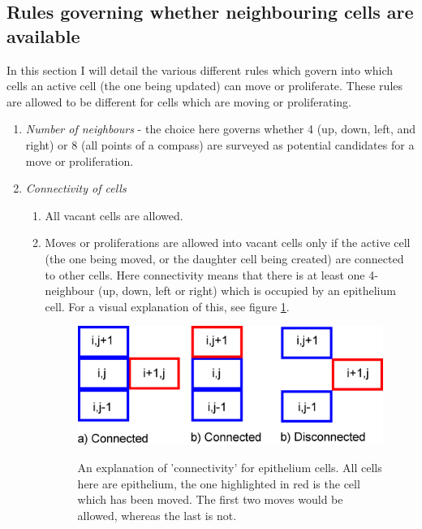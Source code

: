 \documentclass[pdftex,10pt,a4paper]{article}
\begin{document}
\subsection{Rules governing whether neighbouring cells are available}\label{sec:rule_available}
In this section I will detail the various different rules which govern into which cells an active cell (the one being updated) can move or proliferate. These rules are allowed to be different for cells which are moving or proliferating.

\begin{enumerate}
\item \textit{Number of neighbours} - the choice here governs whether 4 (up, down, left, and right) or 8 (all points of a compass) are surveyed as potential candidates for a move or proliferation.
\item \textit{Connectivity of cells}
\begin{enumerate}
\item All vacant cells are allowed.
\item Moves or proliferations are allowed into vacant cells only if the active cell (the one being moved, or the daughter cell being created) are connected to other cells. Here connectivity means that there is at least one 4-neighbour (up, down, left or right) which is occupied by an epithelium cell. For a visual explanation of this, see figure \ref{fig:connected}. \label{item:sticky1}

\begin{figure}[t] 
\centering
\scalebox{0.5} 
{\includegraphics{connected.eps}}
\caption{An explanation of 'connectivity' for epithelium cells. All cells here are epithelium, the one highlighted in red is the cell which has been moved. The first two moves would be allowed, whereas the last is not.}\label{fig:connected}
\end{figure} 



\end{enumerate}
\end{enumerate}
\end{document}
